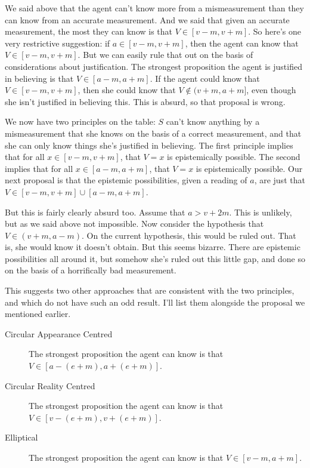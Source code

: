 We said above that the agent can't know more from a mismeasurement than they can know from an accurate measurement. And we said that given an accurate measurement, the most they can know is that $V \in [v - m, v + m]$. So here's one very restrictive suggestion: if $a \in [v - m, v + m]$, then the agent can know that $V \in [v - m, v + m]$. But we can easily rule that out on the basis of considerations about justification. The strongest proposition the agent is justified in believing is that $V \in [a - m, a + m]$. If the agent could know that $V \in [v - m, v + m]$, then she could know that $V \notin (v + m, a + m]$, even though she isn't justified in believing this. This is absurd, so that proposal is wrong.

We now have two principles on the table: $S$ can't know anything by a mismeasurement that she knows on the basis of a correct measurement, and that she can only know things she's justified in believing. The first principle implies that for all $x \in [v - m, v + m]$, that $V = x$ is epistemically possible. The second implies that for all $x \in [a -m, a + m]$, that $V = x$ is epistemically possible. Our next proposal is that the epistemic possibilities, given a reading of $a$, are just that $V \in [v - m, v + m] \cup [a - m, a + m]$.

But this is fairly clearly absurd too. Assume that $a > v + 2m$. This is unlikely, but as we said above not impossible. Now consider the hypothesis that $V \in (v + m, a - m)$. On the current hypothesis, this would be ruled out. That is, she would know it doesn't obtain. But this seems bizarre. There are epistemic possibilities all around it, but somehow she's ruled out this little gap, and done so on the basis of a horrifically bad measurement.

This suggests two other approaches that are consistent with the two principles, and which do not have such an odd result. I'll list them alongside the proposal we mentioned earlier.

\begin{description}
\item[Circular Appearance Centred] The strongest proposition the agent can know is that $V \in [a - (e + m), a + (e + m)]$.
\item[Circular Reality Centred] The strongest proposition the agent can know is that $V \in [v - (e + m), v + (e + m)]$.
\item[Elliptical] The strongest proposition the agent can know is that $V \in [v - m, a + m]$.
\end{description}

